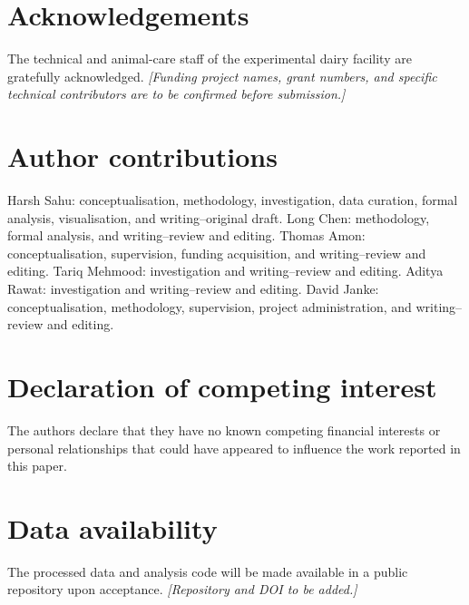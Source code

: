 \documentclass[12pt,a4paper]{article}
\begin{document}
\section*{Acknowledgements}

The technical and animal-care staff of the experimental dairy facility are
gratefully acknowledged. \textit{[Funding project names, grant numbers, and
specific technical contributors are to be confirmed before submission.]}

\section*{Author contributions}

Harsh Sahu: conceptualisation, methodology, investigation, data curation,
formal analysis, visualisation, and writing--original draft. Long Chen:
methodology, formal analysis, and writing--review and editing. Thomas Amon:
conceptualisation, supervision, funding acquisition, and writing--review and
editing. Tariq Mehmood: investigation and writing--review and editing. Aditya
Rawat: investigation and writing--review and editing. David Janke:
conceptualisation, methodology, supervision, project administration, and
writing--review and editing.

\section*{Declaration of competing interest}

The authors declare that they have no known competing financial interests or
personal relationships that could have appeared to influence the work
reported in this paper.

\section*{Data availability}

The processed data and analysis code will be made available in a public
repository upon acceptance. \textit{[Repository and DOI to be added.]}



\end{document}
